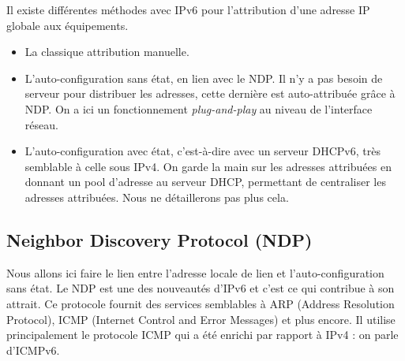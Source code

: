Il existe différentes méthodes avec IPv6 pour l’attribution d’une adresse IP globale aux équipements.

\begin{itemize}
  \item La classique attribution manuelle.
  \item L’auto-configuration sans état, en lien avec le NDP.
Il n’y a pas besoin de serveur pour distribuer les adresses, cette dernière est auto-attribuée grâce à NDP.
On a ici un fonctionnement \emph{plug-and-play} au niveau de l’interface réseau.
  \item L’auto-configuration avec état, c’est-à-dire avec un serveur DHCPv6, très semblable à celle sous IPv4.
On garde la main sur les adresses attribuées en donnant un pool d’adresse au serveur DHCP, permettant de centraliser les adresses attribuées.
Nous ne détaillerons pas plus cela. %
\end{itemize}

\subsection{Neighbor Discovery Protocol (NDP)}

Nous allons ici faire le lien entre l’adresse locale de lien et l’auto-configuration sans état.
Le NDP est une des nouveautés d’IPv6 et c’est ce qui contribue à son attrait.
Ce protocole fournit des services semblables à ARP (Address Resolution Protocol), ICMP (Internet Control and Error Messages) et plus encore.
Il utilise principalement le protocole ICMP qui a été enrichi par rapport à IPv4 : on parle d’ICMPv6.

